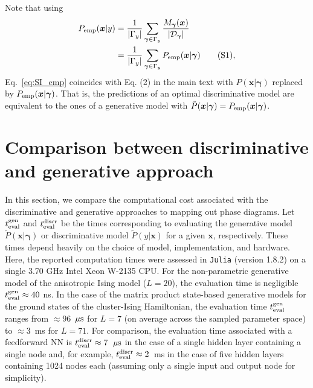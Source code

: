 \documentclass[twocolumn,aps,pra,superscriptaddress,tightlines,nofootinbib]{revtex4-2}
\newcommand\numberthis{\addtocounter{equation}{1}\tag{\theequation}}
\begin{document}
	\indent Note that using
	\begin{align*}
		P_{\rm emp}(\bm{x}|y) &= \frac{1}{|\Gamma_{y}|} \sum_{\bm{\gamma} \in \Gamma_{y}} \frac{M_{\bm{\gamma}}(\bm{x})}{|\mathcal{D}_{\bm{\gamma}}|}\\
		&= \frac{1}{|\Gamma_{y}|} \sum_{\bm{\gamma} \in \Gamma_{y}} P_{\rm emp}(\bm{x}|\bm{\gamma})\numberthis,
	\end{align*}
	Eq.~\eqref{eq:SI_emp} coincides with Eq. (2) in the main text with $P(\bm{x}|\bm{\gamma})$ replaced by $P_{\rm emp}(\bm{x}|\bm{\gamma})$. That is, the predictions of an optimal discriminative model are equivalent to the ones of a generative model with $\tilde{P}(\bm{x}|\bm{\gamma}) = P_{\rm emp}(\bm{x}|\bm{\gamma})$.
	
	\section{Comparison between discriminative and generative approach}
	In this section, we compare the computational cost associated with the discriminative and generative approaches to mapping out phase diagrams. Let $t^{\rm gen}_{\rm eval}$ and $t^{\rm discr}_{\rm eval}$ be the times corresponding to evaluating the generative model $\tilde{P}(\bm{x}|\bm{\gamma})$ or discriminative model $\tilde{P}(y|\bm{x})$ for a given $\bm{x}$, respectively. These times depend heavily on the choice of model, implementation, and hardware. Here, the reported computation times were assessed in \texttt{Julia} (version 1.8.2) on a single 3.70 GHz Intel Xeon W-2135 CPU. For the non-parametric generative model of the anisotropic Ising model ($L=20$), the evaluation time is negligible $t^{\rm gen}_{\rm eval} \approx 40$ ns. In the case of the matrix product state-based generative models for the ground states of the cluster-Ising Hamiltonian, the evaluation time $t^{\rm gen}_{\rm eval}$ ranges from $\approx 96$~${\rm \mu s}$ for $L=7$ (on average across the sampled parameter space) to $\approx 3$~ms for $L=71$. For comparison, the evaluation time associated with a feedforward NN is $t^{\rm discr}_{\rm eval} \approx 7$~${\rm \mu s}$ in the case of a single hidden layer containing a single node and, for example, $t^{\rm discr}_{\rm eval} \approx 2$~ms in the case of five hidden layers containing 1024 nodes each (assuming only a single input and output node for simplicity).
	
\end{document}
